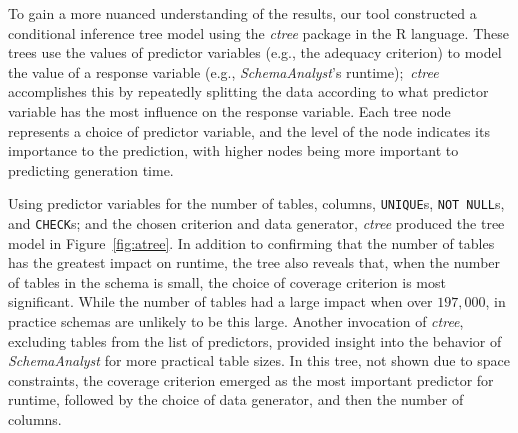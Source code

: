 
To gain a more nuanced understanding of the results, our tool constructed a conditional inference tree model using the
\textit{ctree} package in the R language. These trees use the values of predictor variables (e.g., the adequacy
criterion) to model the value of a response variable (e.g., {\em SchemaAnalyst}'s runtime);~\textit{ctree} accomplishes this
by repeatedly splitting the data according to what predictor variable has the most influence on the response variable.
Each tree node represents a choice of predictor variable, and the level of the node indicates its importance to
the prediction, with higher nodes being more important to predicting generation time.



Using predictor variables for the number of tables, columns, {\tt UNIQUE}s, {\tt NOT NULL}s, and {\tt CHECK}s; and the
chosen criterion and data generator, \textit{ctree} produced the tree model in Figure~\ref{fig:atree}.  In addition to
confirming that the number of tables has the greatest impact on runtime, the tree also reveals that, when the number of
tables in the schema is small, the choice of coverage criterion is most
significant.  While the number of tables had a large impact when over $197,000$, in practice schemas are unlikely to be this large. Another invocation of
\textit{ctree}, excluding tables from the list of predictors, provided insight into the behavior of
\textit{SchemaAnalyst} for more practical table sizes. In this tree, not shown due to space constraints, the coverage
criterion emerged as the most important predictor for runtime, followed by the choice of data generator, and then the
number of columns.
